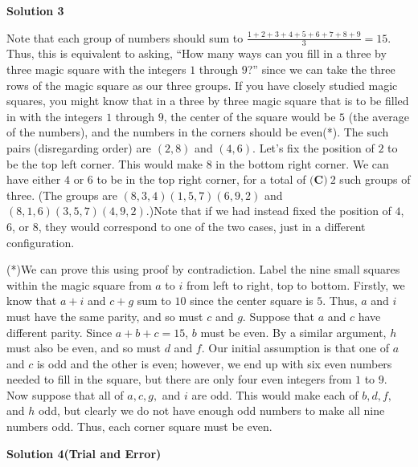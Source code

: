 \begin{enumerate}
 



\textbf{Solution 3}

Note that each group of numbers should sum to $\frac{1+2+3+4+5+6+7+8+9}{3} = 15.$ Thus, this is equivalent to asking, “How many ways can you fill in a three by three magic square with the integers $1$ through $9$?” since we can take the three rows of the magic square as our three groups. If you have closely studied magic squares, you might know that in a three by three magic square that is to be filled in with the integers $1$ through $9$, the center of the square would be $5$ (the average of the numbers), and the numbers in the corners should be even(*). The such pairs (disregarding order) are $(2,8)$ and $(4,6).$ Let’s fix the position of $2$ to be the top left corner. This would make $8$ in the bottom right corner. We can have either $4$ or $6$ to be in the top right corner, for a total of $\boxed{\textbf{(C)}\ 2}$ such groups of three. (The groups are $(8,3,4) (1,5,7) (6,9,2)$ and $(8,1,6) (3,5,7) (4,9,2).$)Note that if we had instead fixed the position of $4$, $6$, or $8$, they would correspond to one of the two cases, just in a different configuration.

 
(*)We can prove this using proof by contradiction. Label the nine small squares within the magic square from $a$ to $i$ from left to right, top to bottom. Firstly, we know that $a+i$ and $c+g$ sum to $10$ since the center square is $5$. Thus, $a$ and $i$ must have the same parity, and so must $c$ and $g$. Suppose that $a$ and $c$ have different parity. Since $a+b+c=15$, $b$ must be even. By a similar argument, $h$ must also be even, and so must $d$ and $f$. Our initial assumption is that one of $a$ and $c$ is odd and the other is even; however, we end up with six even numbers needed to fill in the square, but there are only four even integers from $1$ to $9$. Now suppose that all of $a, c, g,$ and $i$ are odd. This would make each of $b, d, f,$ and $h$ odd, but clearly we do not have enough odd numbers to make all nine numbers odd. Thus, each corner square must be even.

 



\textbf{Solution 4(Trial and Error)}


\end{enumerate}
